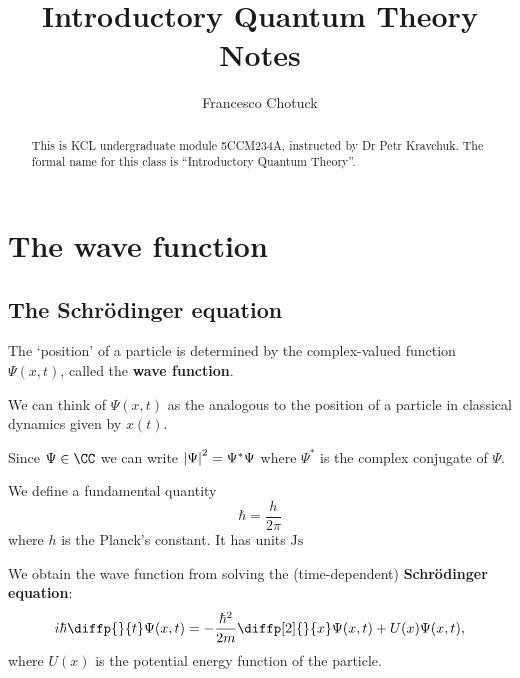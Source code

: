 \documentclass[12pt, a4paper]{article}
\title{Introductory Quantum Theory Notes}
\date{}
\author{Francesco Chotuck}
\begin{document}
\maketitle

\begin{abstract}
    This is KCL undergraduate module 5CCM234A, instructed by Dr Petr Kravchuk. The formal name for this class is ``Introductory Quantum Theory''.
\end{abstract}

\tableofcontents

\pagebreak

\section{The wave function}

\subsection{The Schrödinger equation}

\begin{definition}
    The `position' of a particle is determined by the complex-valued function \(\Psi(x,t)\), called the \textbf{wave function}.
\end{definition}

\begin{mdnote}
    We can think of \(\Psi(x,t)\) as the analogous to the position of a particle in classical dynamics given by \(x(t)\).
\end{mdnote}

\begin{theorem}
    Since \(\Psi \in \CC\) we can write \(\abs{\Psi}^2 = \Psi^*\Psi\) where \(\Psi^*\) is the complex conjugate of \(\Psi\).
\end{theorem}

\begin{definition}
    We define a fundamental quantity 
    \[\hbar = \frac{h}{2 \pi}\]
    where \(h\) is the Planck's constant. It has units \(\unit{\joule\second}\)
\end{definition}

\begin{mdthm}
    We obtain the wave function from solving the (time-dependent) \textbf{Schrödinger equation}:
    \[i \hbar \diffp{}{t} \Psi(x,t) = - \frac{\hbar^2}{2m} \diffp[2]{}{x}\Psi(x,t) + U(x)\Psi(x,t),\]
    where \(U(x)\) is the potential energy function of the particle.
\end{mdthm}
\end{document}
